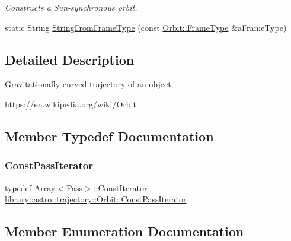 \begin{DoxyCompactItemize}
\begin{DoxyCompactList}\small\item\em Constructs a Sun-\/synchronous orbit. \end{DoxyCompactList}\item 
static String \hyperlink{classlibrary_1_1astro_1_1trajectory_1_1_orbit_a302ee3d55713b92cc112f747f7a1b1a2}{String\+From\+Frame\+Type} (const \hyperlink{classlibrary_1_1astro_1_1trajectory_1_1_orbit_a816e83a0c220d4242ce2bebd32191cd8}{Orbit\+::\+Frame\+Type} \&a\+Frame\+Type)
\end{DoxyCompactItemize}


\subsection{Detailed Description}
Gravitationally curved trajectory of an object. 

https\+://en.wikipedia.\+org/wiki/\+Orbit 

\subsection{Member Typedef Documentation}
\mbox{\label{classlibrary_1_1astro_1_1trajectory_1_1_orbit_a469467fc3e208ae6f8a79f8177b913ff}} 
\subsubsection{\texorpdfstring{Const\+Pass\+Iterator}{ConstPassIterator}}
{\footnotesize\ttfamily typedef Array$<$\hyperlink{classlibrary_1_1astro_1_1trajectory_1_1orbit_1_1_pass}{Pass}$>$\+::Const\+Iterator \hyperlink{classlibrary_1_1astro_1_1trajectory_1_1_orbit_a469467fc3e208ae6f8a79f8177b913ff}{library\+::astro\+::trajectory\+::\+Orbit\+::\+Const\+Pass\+Iterator}}



\subsection{Member Enumeration Documentation}
\mbox{\label{classlibrary_1_1astro_1_1trajectory_1_1_orbit_a816e83a0c220d4242ce2bebd32191cd8}} 
